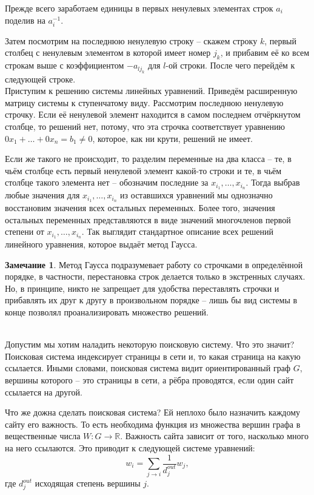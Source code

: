 \documentclass[10pt,a4paper,oneside]{book} %
\theoremstyle{definition}
\newtheorem*{rem}{Замечание}
\newcommand{\mb}[1]{\mathbb{#1}}
\def\exm{\noindent {\bf Примеры:}}
\def\rm{\begin{rem}}
\def\erm{\end{rem}}
\begin{document}
Прежде всего заработаем единицы в первых ненулевых элементах строк $a_i$ поделив на $a_i^{-1}$.

Затем посмотрим на последнюю ненулевую строку -- скажем строку $k$, первый  столбец с ненулевым элементом в которой имеет номер $j_k$, и прибавим её ко всем строкам выше с коэффициентом $-a_{lj_k}$ для $l$-ой строки. После чего перейдём к следующей строке.\\



Приступим к решению системы линейных уравнений. Приведём расширенную матрицу системы к ступенчатому виду. Рассмотрим последнюю ненулевую строчку. Если её ненулевой элемент находится в самом последнем отчёркнутом столбце, то решений нет, потому, что эта строчка соответствует уравнению $0x_1+\dots+0x_n=b_1\neq 0$, которое, как ни крути, решений не имеет. 

Если же такого не происходит, то разделим переменные на два класса -- те, в чьём столбце есть первый ненулевой элемент какой-то строки и те, в чьём столбце такого элемента нет -- обозначим последние за $x_{i_1},\dots,x_{i_n}$. Тогда выбрав любые значения для $x_{i_1},\dots,x_{i_n}$ из оставшихся уравнений мы однозначно восстановим значения всех остальных переменных. Более того, значения остальных переменных представляются в виде значений многочленов первой степени от  $x_{i_1},\dots,x_{i_n}$. Так выглядит стандартное описание всех решений линейного уравнения, которое выдаёт метод Гаусса. 

\rm Метод Гаусса подразумевает работу со строчками в определённой порядке, в частности, перестановка строк делается только в экстренных случаях. Но, в принципе, никто не запрещает для удобства переставлять строчки и прибавлять их друг к другу в произвольном порядке -- лишь бы вид системы в конце позволял проанализировать множество решений.
\erm

\exm\\
Допустим мы хотим наладить некоторую поисковую систему. Что это значит? Поисковая система индексирует страницы в сети и, то какая страница на какую ссылается. Иными словами, поисковая система видит ориентированный граф $G$, вершины которого -- это страницы в сети, а рёбра проводятся, если один сайт ссылается на другой. 

Что же дожна сделать поисковая система? Ей неплохо было назначить каждому сайту его важность. То есть необходима функция из множества вершин графа в вещественные числа  $W\colon G \to \mb R$. Важность сайта зависит от того, насколько много на него ссылаются. Это приводит  к следующей системе уравнений:
$$w_i=\sum_{j\to i} \frac{1}{d_j^{out}}w_j,$$
где $d_j^{out}$ исходящая степень вершины $j$. 
\end{document}
